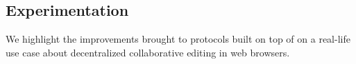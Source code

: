 
\subsection{Experimentation}
\label{subsec:experiments2}

We highlight the improvements brought to protocols built on top of \SPRAY on a
real-life use case about decentralized collaborative editing in web browsers.




